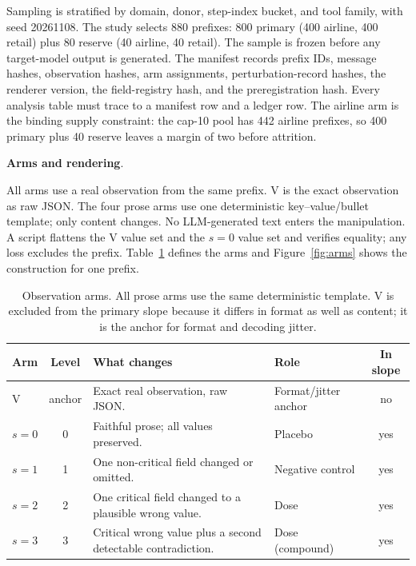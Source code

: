 \documentclass[a4paper,fleqn]{cas-sc}
\begin{document}
Sampling is stratified by domain, donor, step-index bucket, and tool family, with seed 20261108.
The study selects 880 prefixes: 800 primary (400 airline, 400 retail) plus 80 reserve (40
airline, 40 retail). The sample is frozen before any target-model output is generated. The
manifest records prefix IDs, message hashes, observation hashes, arm assignments,
perturbation-record hashes, the renderer version, the field-registry hash, and the preregistration
hash. Every analysis table must trace to a manifest row and a ledger row. The airline arm is the
binding supply constraint: the cap-10 pool has 442 airline prefixes, so 400 primary plus 40
reserve leaves a margin of two before attrition.

\noindent\textbf{Arms and rendering}.\ \label{sec:arms}

All arms use a real observation from the same prefix. V is the exact observation as raw JSON. The
four prose arms use one deterministic key--value/bullet template; only content changes. No
LLM-generated text enters the manipulation. A script flattens the V value set and the $s=0$ value
set and verifies equality; any loss excludes the prefix. Table~\ref{tab:arms} defines the arms
and Figure~\ref{fig:arms} shows the construction for one prefix.

\begin{table}[pos=htbp]
  \centering
  \caption{Observation arms. All prose arms use the same deterministic template. V is excluded
  from the primary slope because it differs in format as well as content; it is the anchor for
  format and decoding jitter.}
  \label{tab:arms}
  \small
  \begin{tabular}{>{\raggedright\arraybackslash}p{1.3cm}c>{\raggedright\arraybackslash}p{6.3cm}>{\raggedright\arraybackslash}p{4.6cm}c}
    \toprule
    \textbf{Arm} & \textbf{Level} & \textbf{What changes} & \textbf{Role} & \textbf{In slope} \\
    \midrule
    V     & anchor & Exact real observation, raw JSON. & Format/jitter anchor & no \\
    $s=0$ & 0      & Faithful prose; all values preserved. & Placebo & yes \\
    $s=1$ & 1      & One non-critical field changed or omitted. & Negative control & yes \\
    $s=2$ & 2      & One critical field changed to a plausible wrong value. & Dose & yes \\
    $s=3$ & 3      & Critical wrong value plus a second detectable contradiction. & Dose (compound) & yes \\
    \bottomrule
  \end{tabular}
\end{table}
\end{document}

